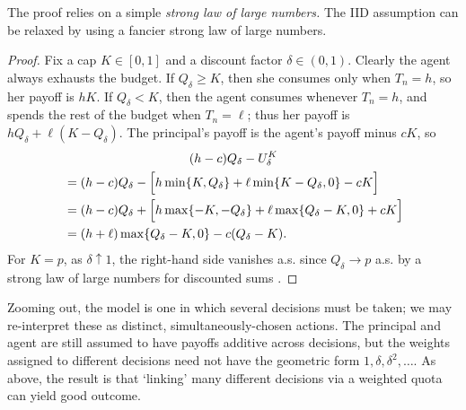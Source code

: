The proof relies on a simple \emph{strong law of large numbers.}
The IID assumption can be relaxed by using a fancier strong law of large numbers.

\begin{proof}
	Fix a cap $K \in [0,1]$ and a discount factor $\delta \in (0,1)$.
	Clearly the agent always exhausts the budget.
	If $Q_\delta \geq K$, then she consumes only when $T_n=h$,
	so her payoff is $h K$.
	If $Q_\delta < K$, then the agent consumes whenever $T_n=h$,
	and spends the rest of the budget when $T_n=\ell$;
	thus her payoff is $h Q_\delta + \ell (K-Q_\delta)$.
	The principal's payoff is the agent's payoff minus $cK$, so
	\begin{multline*}
		(h-c) Q_\delta
		- U_\delta^K
		\\
		\begin{aligned}
			&= (h-c) Q_\delta
			- \Bigl[
			h \min\{K,Q_\delta\}
			+ \ell \min\{K-Q_\delta,0\}
			- c K 
			\Bigr]
			\\
			&= (h-c) Q_\delta
			+ \Bigl[
			h \max\{-K,-Q_\delta\}
			+ \ell \max\{Q_\delta-K,0\}
			+ c K 
			\Bigr]
			\\
			&= (h+\ell) \max\{Q_\delta-K,0\}
			- c (Q_\delta-K) .			
		\end{aligned}		
	\end{multline*}
	For $K=p$,
	as $\delta \uparrow 1$,
	the right-hand side vanishes a.s.
	since $Q_\delta \to p$ a.s.
	by a strong law of large numbers for discounted sums \parencite[see][]{Lai1974}.
\end{proof}


\begin{remark}
	\label{remark:het}
	Zooming out, the model is one in which several decisions must be taken;
	we may re-interpret these as distinct, simultaneously-chosen actions.
	The principal and agent are still assumed to have payoffs additive across decisions, but the weights assigned to different decisions need not have the geometric form $1, \delta, \delta^2, \dots$.
	As above, the result is that `linking' many different decisions via a weighted quota can yield good outcome.
\end{remark}


